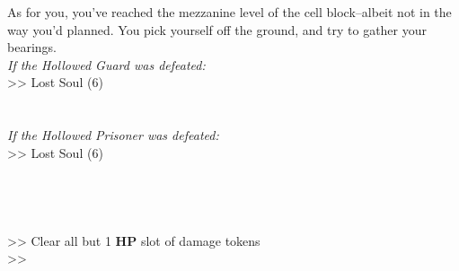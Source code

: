 As for you, you’ve reached the mezzanine level of the cell block--albeit not in the way you’d planned. You pick yourself off the ground, and try to gather your bearings.\\

\emph{If the Hollowed Guard was defeated:}\\
>> Lost Soul (6)\\
\\
\\

\emph{If the Hollowed Prisoner was defeated:}\\
>> Lost Soul (6)\\
\\
\\
\\
\\

>> Clear all but 1 \textbf{HP} slot of damage tokens\\
>> 